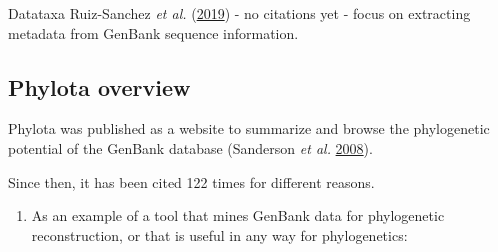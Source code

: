 \documentclass[]{article}
\providecommand{\tightlist}{%
  \setlength{\itemsep}{0pt}\setlength{\parskip}{0pt}}
\begin{document}
Datataxa Ruiz-Sanchez \emph{et al.} (\protect\hyperlink{ref-ruiz2019datataxa}{2019}) - no citations yet - focus on extracting metadata from GenBank sequence information.

\hypertarget{phylota-overview}{%
\subsection{Phylota overview}\label{phylota-overview}}

Phylota was published as a website to summarize and browse the phylogenetic potential of the GenBank
database (Sanderson \emph{et al.} \protect\hyperlink{ref-sanderson2008phylota}{2008}).

Since then, it has been cited 122 times for different reasons.

\begin{enumerate}
\def\labelenumi{\arabic{enumi}.}
\tightlist
\item
  As an example of a tool that mines GenBank data for phylogenetic reconstruction,
  or that is useful in any way for phylogenetics:


\end{enumerate}
\end{document}
